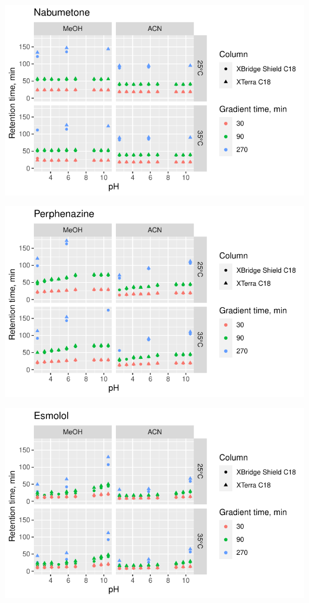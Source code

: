 \documentclass[
  letterpaper,
  DIV=11,
  numbers=noendperiod]{scrreprt}
\begin{document}
\includegraphics{index_files/figure-pdf/unnamed-chunk-4-48.pdf}

\includegraphics{index_files/figure-pdf/unnamed-chunk-4-49.pdf}

\includegraphics{index_files/figure-pdf/unnamed-chunk-4-50.pdf}
\end{document}
